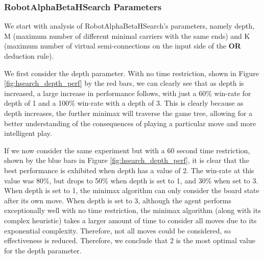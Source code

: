 \subsubsection{RobotAlphaBetaHSearch Parameters}
We start with analysis of RobotAlphaBetaHSearch's parameters, namely depth, M (maximum number of different minimal carriers with the same ends) and K (maximum number of virtual semi-connections on the input side of the \textbf{OR} deduction rule). 



We first consider the depth parameter. With no time restriction, shown in Figure \ref{fig:hsearch_depth_perf} by the red bars, we can clearly see that as depth is increased, a large increase in performance follows, with just a 60\% win-rate for depth of 1 and a 100\% win-rate with a depth of 3. This is clearly because as depth increases, the further minimax will traverse the game tree, allowing for a better understanding of the consequences of playing a particular move and more intelligent play. 



If we now consider the same experiment but with a 60 second time restriction, shown by the blue bars in Figure \ref{fig:hsearch_depth_perf}, it is clear that the best performance is exhibited when depth has a value of 2. The win-rate at this value was 80\%, but drops to 50\% when depth is set to 1, and 30\% when set to 3. When depth is set to 1, the minimax algorithm can only consider the board state after its own move. When depth is set to 3, although the agent performs exceptionally well with no time restriction, the minimax algorithm (along with its complex heuristic) takes a larger amount of time to consider all moves due to its exponential complexity. Therefore, not all moves could be considered, so effectiveness is reduced. Therefore, we conclude that 2 is the most optimal value for the depth parameter.


